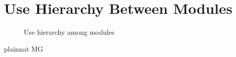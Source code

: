 \documentclass[12pt, titlepage]{article}
\begin{document}
\section{Use Hierarchy Between Modules} \label{SecUse}
\begin{figure}[H]
\centering
\caption{Use hierarchy among modules}
\label{FigUH}
\end{figure}
 {plainnat}
 {MG}
\end{document}
